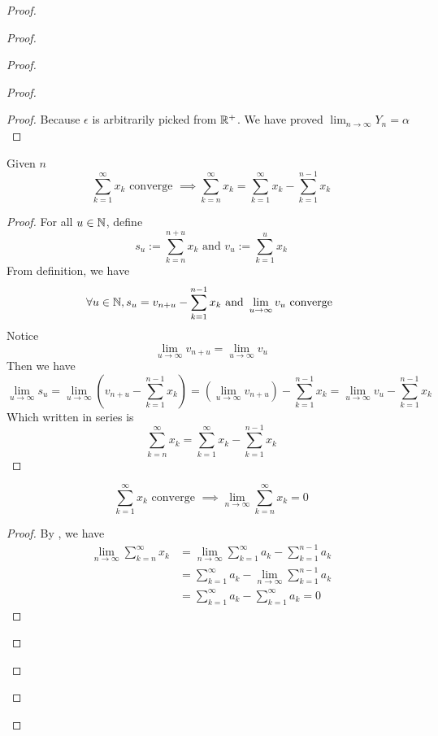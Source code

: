 \documentclass{report}
\begin{document}
\begin{proof}
\begin{proof}
\begin{proof}
\begin{proof}
\begin{proof}
Because $\epsilon $ is arbitrarily picked from $\mathbb{R}^+$. We have proved  $\lim_{n\to\infty}Y_n=\alpha $
\end{proof}
\begin{lemma}
\label{8.4.2}
Given $n$
\begin{equation}
  \sum_{k=1}^\infty x_k\text{ converge }\implies \sum_{k=n}^\infty x_k=\sum_{k=1}^\infty x_k-\sum_{k=1}^{n-1}x_k
\end{equation}
\end{lemma}
\begin{proof}
For all $u\in\mathbb{N}$, define 
\begin{equation}
s_u:=\sum_{k=n}^{n+u}x_k\text{ and }v_u:=\sum_{k=1}^{u}x_k
\end{equation}
From definition, we have
\begin{equation}
  \forall u\in\mathbb{N},s_u=v_{n+u}-\sum_{k=1}^{n-1}x_k\text{ and }\lim_{u\to\infty}v_u\text{ converge }
\end{equation}
Notice 
\begin{equation}
\lim_{u\to\infty}v_{n+u}=\lim_{u\to\infty}v_u
\end{equation}
Then we have
\begin{equation}
\lim_{u\to\infty}s_u=\lim_{u\to\infty} (v_{n+u}-\sum_{k=1}^{n-1}x_k)=(\lim_{u\to\infty}v_{n+u})-\sum_{k=1}^{n-1}x_k=\lim_{u\to\infty}v_u-\sum_{k=1}^{n-1}x_k
\end{equation}
Which written in series is
\begin{equation}
\sum_{k=n}^{\infty} x_k=\sum_{k=1}^\infty x_k-\sum_{k=1}^{n-1}x_k
\end{equation}
\end{proof}
\begin{lemma}
\label{8.4.3}
\begin{equation}
\sum_{k=1}^\infty x_k\text{ converge }\implies \lim_{n\to\infty}\sum_{k=n}^\infty x_k=0
\end{equation}
\end{lemma}
\begin{proof} 
By , we have
\begin{align}
  \lim_{n\to\infty}\sum_{k=n}^\infty x_k&=\lim_{n\to\infty}\sum_{k=1}^\infty a_k-\sum_{k=1}^{n-1}a_k\\
  &=\sum_{k=1}^\infty a_k-\lim_{n\to\infty}\sum_{k=1}^{n-1}a_k\\
  &=\sum_{k=1}^\infty a_k-\sum_{k=1}^\infty a_k=0
\end{align}
\end{proof}
\begin{question}{}{}

\end{question}
\end{proof}
\end{proof}
\end{proof}
\end{proof}
\end{document}

